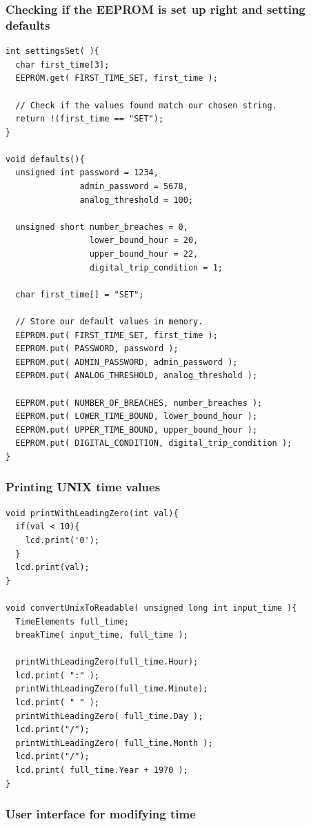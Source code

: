 \documentclass[a4paper,11pt]{article}
\theoremstyle{mytheor}
\begin{document}
\subsubsection{Checking if the EEPROM is set up right and setting defaults}
\begin{lstlisting}
int settingsSet( ){
  char first_time[3];
  EEPROM.get( FIRST_TIME_SET, first_time );
  
  // Check if the values found match our chosen string.
  return !(first_time == "SET");
}

void defaults(){
  unsigned int password = 1234, 
               admin_password = 5678, 
               analog_threshold = 100;

  unsigned short number_breaches = 0,
                 lower_bound_hour = 20,
                 upper_bound_hour = 22,
                 digital_trip_condition = 1;

  char first_time[] = "SET";
  
  // Store our default values in memory.
  EEPROM.put( FIRST_TIME_SET, first_time );
  EEPROM.put( PASSWORD, password );
  EEPROM.put( ADMIN_PASSWORD, admin_password );
  EEPROM.put( ANALOG_THRESHOLD, analog_threshold );

  EEPROM.put( NUMBER_OF_BREACHES, number_breaches );
  EEPROM.put( LOWER_TIME_BOUND, lower_bound_hour );
  EEPROM.put( UPPER_TIME_BOUND, upper_bound_hour );
  EEPROM.put( DIGITAL_CONDITION, digital_trip_condition );
}
\end{lstlisting}

\subsubsection{Printing UNIX time values}
\begin{lstlisting}
void printWithLeadingZero(int val){
  if(val < 10){
    lcd.print('0');
  }
  lcd.print(val);
}

void convertUnixToReadable( unsigned long int input_time ){
  TimeElements full_time;
  breakTime( input_time, full_time );

  printWithLeadingZero(full_time.Hour);
  lcd.print( ":" );
  printWithLeadingZero(full_time.Minute); 
  lcd.print( " " );
  printWithLeadingZero( full_time.Day );
  lcd.print("/");
  printWithLeadingZero( full_time.Month );
  lcd.print("/");
  lcd.print( full_time.Year + 1970 );
}
\end{lstlisting}

\subsubsection{User interface for modifying time}
\end{document}
